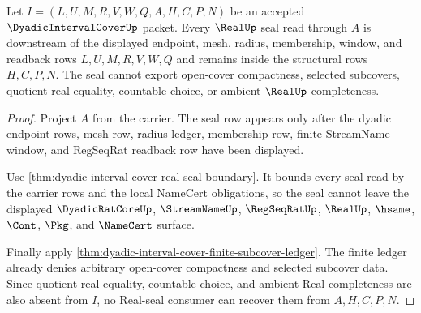 \begin{theorem}
\label{thm:dyadic-interval-cover-real-seal-nonescape}
Let $I=(L,U,M,R,V,W,Q,A,H,C,P,N)$ be an accepted $\DyadicIntervalCoverUp$ packet. Every $\RealUp$ seal read through $A$ is downstream of the displayed endpoint, mesh, radius, membership, window, and readback rows $L,U,M,R,V,W,Q$ and remains inside the structural rows $H,C,P,N$. The seal cannot export open-cover compactness, selected subcovers, quotient real equality, countable choice, or ambient $\RealUp$ completeness.
\end{theorem}
\begin{proof}
Project $A$ from the carrier. The seal row appears only after the dyadic endpoint rows, mesh row, radius ledger, membership row, finite StreamName window, and RegSeqRat readback row have been displayed.

Use \autoref{thm:dyadic-interval-cover-real-seal-boundary}. It bounds every seal read by the carrier rows and the local NameCert obligations, so the seal cannot leave the displayed $\DyadicRatCoreUp$, $\StreamNameUp$, $\RegSeqRatUp$, $\RealUp$, $\hsame$, $\Cont$, $\Pkg$, and $\NameCert$ surface.

Finally apply \autoref{thm:dyadic-interval-cover-finite-subcover-ledger}. The finite ledger already denies arbitrary open-cover compactness and selected subcover data. Since quotient real equality, countable choice, and ambient Real completeness are also absent from $I$, no Real-seal consumer can recover them from $A,H,C,P,N$.
\end{proof}

